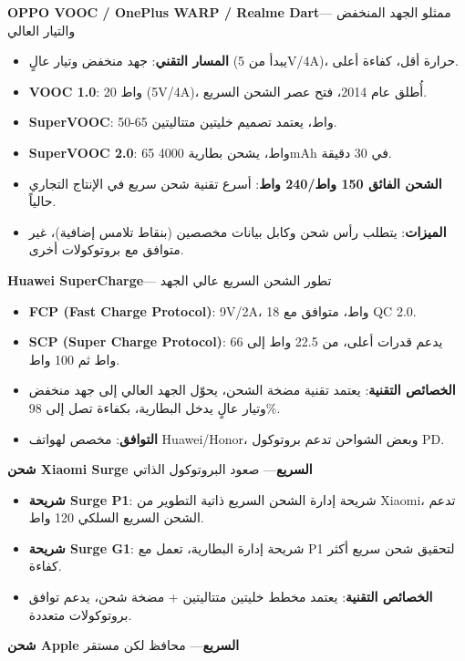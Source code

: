 \textbf{OPPO VOOC / OnePlus WARP / Realme Dart}— ممثلو الجهد المنخفض والتيار العالي

\begin{itemize}
  \item \textbf{المسار التقني}: جهد منخفض وتيار عالٍ (يبدأ من 5V/4A)، حرارة أقل، كفاءة أعلى.
  \item \textbf{VOOC 1.0}: 20 واط (5V/4A)، أُطلق عام 2014، فتح عصر الشحن السريع.
  \item \textbf{SuperVOOC}: 50-65 واط، يعتمد تصميم خليتين متتاليتين.
  \item \textbf{SuperVOOC 2.0}: 65 واط، يشحن بطارية 4000mAh في 30 دقيقة.
  \item \textbf{الشحن الفائق 150 واط/240 واط}: أسرع تقنية شحن سريع في الإنتاج التجاري حالياً.
  \item \textbf{الميزات}: يتطلب رأس شحن وكابل بيانات مخصصين (بنقاط تلامس إضافية)، غير متوافق مع بروتوكولات أخرى.
\end{itemize}

\textbf{Huawei SuperCharge}— تطور الشحن السريع عالي الجهد

\begin{itemize}
  \item \textbf{FCP (Fast Charge Protocol)}: 9V/2A، 18 واط، متوافق مع QC 2.0.
  \item \textbf{SCP (Super Charge Protocol)}: يدعم قدرات أعلى، من 22.5 واط إلى 66 واط ثم 100 واط.
  \item \textbf{الخصائص التقنية}: يعتمد تقنية مضخة الشحن، يحوّل الجهد العالي إلى جهد منخفض وتيار عالٍ يدخل البطارية، بكفاءة تصل إلى 98\%.
  \item \textbf{التوافق}: مخصص لهواتف Huawei/Honor، وبعض الشواحن تدعم بروتوكول PD.
\end{itemize}

\textbf{شحن Xiaomi Surge السريع}— صعود البروتوكول الذاتي

\begin{itemize}
  \item \textbf{شريحة Surge P1}: شريحة إدارة الشحن السريع ذاتية التطوير من Xiaomi، تدعم الشحن السريع السلكي 120 واط.
  \item \textbf{شريحة Surge G1}: شريحة إدارة البطارية، تعمل مع P1 لتحقيق شحن سريع أكثر كفاءة.
  \item \textbf{الخصائص التقنية}: يعتمد مخطط خليتين متتاليتين + مضخة شحن، يدعم توافق بروتوكولات متعددة.
\end{itemize}

\textbf{شحن Apple السريع}— محافظ لكن مستقر

